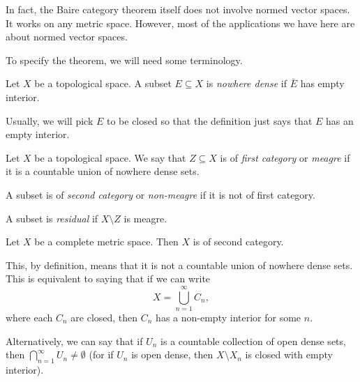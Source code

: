 \documentclass[a4paper]{article}
\begin{document}
In fact, the Baire category theorem itself does not involve normed vector spaces. It works on any metric space. However, most of the applications we have here are about normed vector spaces.

To specify the theorem, we will need some terminology.

\begin{defi}
  Let $X$ be a topological space. A subset $E\subseteq X$ is \emph{nowhere dense} if $\bar{E}$ has empty interior.
\end{defi}
Usually, we will pick $E$ to be closed so that the definition just says that $E$ has an empty interior.

\begin{defi}
  Let $X$ be a topological space. We say that $Z\subseteq X$ is of \emph{first category} or \emph{meagre} if it is a countable union of nowhere dense sets.

  A subset is of \emph{second category} or \emph{non-meagre} if it is not of first category.

  A subset is \emph{residual} if $X\setminus Z$ is meagre.
\end{defi}

\begin{thm}
  Let $X$ be a complete metric space. Then $X$ is of second category.
\end{thm}
This, by definition, means that it is not a countable union of nowhere dense sets. This is equivalent to saying that if we can write
\[
  X = \bigcup_{n = 1}^\infty C_n,
\]
where each $C_n$ are closed, then $C_n$ has a non-empty interior for some $n$.

Alternatively, we can say that if $U_n$ is a countable collection of open dense sets, then $\bigcap_{n = 1}^\infty U_n \not= \emptyset$ (for if $U_n$ is open dense, then $X\setminus X_n$ is closed with empty interior).
\end{document}
